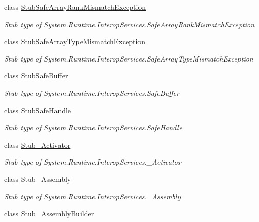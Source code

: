 \begin{DoxyCompactItemize}
class \hyperlink{class_system_1_1_runtime_1_1_interop_services_1_1_fakes_1_1_stub_safe_array_rank_mismatch_exception}{Stub\-Safe\-Array\-Rank\-Mismatch\-Exception}
\begin{DoxyCompactList}\small\item\em Stub type of System.\-Runtime.\-Interop\-Services.\-Safe\-Array\-Rank\-Mismatch\-Exception\end{DoxyCompactList}\item 
class \hyperlink{class_system_1_1_runtime_1_1_interop_services_1_1_fakes_1_1_stub_safe_array_type_mismatch_exception}{Stub\-Safe\-Array\-Type\-Mismatch\-Exception}
\begin{DoxyCompactList}\small\item\em Stub type of System.\-Runtime.\-Interop\-Services.\-Safe\-Array\-Type\-Mismatch\-Exception\end{DoxyCompactList}\item 
class \hyperlink{class_system_1_1_runtime_1_1_interop_services_1_1_fakes_1_1_stub_safe_buffer}{Stub\-Safe\-Buffer}
\begin{DoxyCompactList}\small\item\em Stub type of System.\-Runtime.\-Interop\-Services.\-Safe\-Buffer\end{DoxyCompactList}\item 
class \hyperlink{class_system_1_1_runtime_1_1_interop_services_1_1_fakes_1_1_stub_safe_handle}{Stub\-Safe\-Handle}
\begin{DoxyCompactList}\small\item\em Stub type of System.\-Runtime.\-Interop\-Services.\-Safe\-Handle\end{DoxyCompactList}\item 
class \hyperlink{class_system_1_1_runtime_1_1_interop_services_1_1_fakes_1_1_stub___activator}{Stub\-\_\-\-Activator}
\begin{DoxyCompactList}\small\item\em Stub type of System.\-Runtime.\-Interop\-Services.\-\_\-\-Activator\end{DoxyCompactList}\item 
class \hyperlink{class_system_1_1_runtime_1_1_interop_services_1_1_fakes_1_1_stub___assembly}{Stub\-\_\-\-Assembly}
\begin{DoxyCompactList}\small\item\em Stub type of System.\-Runtime.\-Interop\-Services.\-\_\-\-Assembly\end{DoxyCompactList}\item 
class \hyperlink{class_system_1_1_runtime_1_1_interop_services_1_1_fakes_1_1_stub___assembly_builder}{Stub\-\_\-\-Assembly\-Builder}

\end{DoxyCompactItemize}
